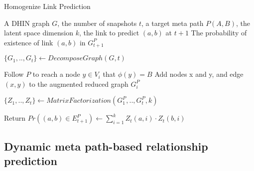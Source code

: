 \begin{algorithm}[t]
\caption{Homogenize Link Prediction}\label{alg1}
\begin{algorithmic}[1]\scriptsize
\REQUIRE A DHIN graph $G$, the number of snapshots $t$, a target meta path $P(A,B)$, the latent space dimension $k$, the link to predict $(a,b)$ at $t+1$
\ENSURE The probability of existence of link $(a,b)$ in $G^P_{t+1}$

\STATE $\{G_1, .., G_t\} \leftarrow DecomposeGraph(G, t)$

    
        \STATE Follow $P$ to reach a node $y\in V_i$ that $\phi(y)=B$%
        \STATE Add nodes x and y, and edge $(x,y)$ to the augmented reduced graph $G_i^P$ 
\ENDFOR

\ENDFOR
\STATE $\{Z_1, .., Z_t\} \leftarrow MatrixFactorization(G^P_1, .., G^P_t, k)$

\STATE Return $Pr((a,b)\in E^P_{t+1}) \leftarrow \sum_{i=1}^{k} Z_t(a,i)\cdot Z_t(b,i)$


\end{algorithmic}
\end{algorithm}



\subsection{Dynamic meta path-based relationship prediction}

